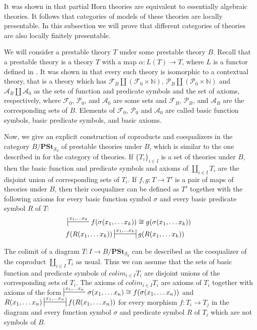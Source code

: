 \documentclass[reqno]{amsart}
\theoremstyle{definition}
\theoremstyle{remark}
\newcommand{\cat}[1]{\mathbf{#1}}
\newcommand{\PSt}{\cat{PSt}}
\numberwithin{figure}{section}
\begin{document}
It was shown in \cite{PHL} that partial Horn theories are equivalent to essentially algebraic theories.
It follows that categories of models of these theories are locally presentable.
In this subsection we will prove that different categories of theories are also locally finitely presentable.

We will consider a prestable theory $T$ under some prestable theory $B$.
Recall that a prestable theory is a theory $T$ with a map $\alpha : L(T) \to T$, where $L$ is a functor defined in \cite{alg-tt}.
It was shown in \cite[Lemma~4.4]{alg-tt} that every such theory is isomorphic to a contextual theory,
that is a theory which has $\mathcal{F}_B \amalg (\mathcal{F}_0 \times \mathbb{N})$,
$\mathcal{P}_B \amalg (\mathcal{P}_0 \times \mathbb{N})$ and $\mathcal{A}_B \amalg \mathcal{A}_0$ as the sets of function and predicate symbols and the set of axioms, respectively,
where $\mathcal{F}_0$, $\mathcal{P}_0$, and $\mathcal{A}_0$ are some sets and $\mathcal{F}_B$, $\mathcal{P}_B$, and $\mathcal{A}_B$ are the corresponding sets of $B$.
Elements of $\mathcal{F}_0$, $\mathcal{P}_0$ and $\mathcal{A}_0$ are called basic function symbols, basic predicate symbols, and basic axioms.

Now, we give an explicit construction of coproducts and coequalizers in the category $B/\PSt_{\mathcal{S}_0}$ of prestable theories under $B$,
which is similar to the one described in \cite[Proposition~2.12]{alg-tt} for the category of theories.
If $\{ T_i \}_{i \in I}$ is a set of theories under $B$, then the basic function and predicate symbols
and axioms of $\coprod_{i \in I} T_i$ are the disjoint union of corresponding sets of $T_i$.
If $f,g : T \to T'$ is a pair of maps of theories under $B$, then their coequalizer can be defined as
$T'$ together with the following axioms for every basic function symbol $\sigma$ and every basic predicate symbol $R$ of $T$:
\begin{align*}
& \sststile{}{x_1, \ldots x_k} f(\sigma(x_1, \ldots x_k)) \cong g(\sigma(x_1, \ldots x_k)) \\
& f(R(x_1, \ldots x_k)) \ssststile{}{x_1, \ldots x_k} g(R(x_1, \ldots x_k))
\end{align*}

The colimit of a diagram $T : I \to B/\PSt_{\mathcal{S}_0}$ can be described as the coequalizer of the coproduct $\coprod_{i \in I} T_i$ as usual.
Thus we can assume that the sets of basic function and predicate symbols of $colim_{i \in I} T_i$ are disjoint unions of the corresponding sets of $T_i$.
The axioms of $colim_{i \in I} T_i$ are axioms of $T_i$ together with axioms of the form $\sststile{}{x_1, \ldots x_n} \sigma(x_1, \ldots x_n) \cong f(\sigma(x_1, \ldots x_n))$
and $R(x_1, \ldots x_n) \ssststile{}{x_1, \ldots x_n} f(R(x_1, \ldots x_n))$ for every morphism $f : T_i \to T_j$
in the diagram and every function symbol $\sigma$ and predicate symbol $R$ of $T_i$ which are not symbols of $B$.
\end{document}
